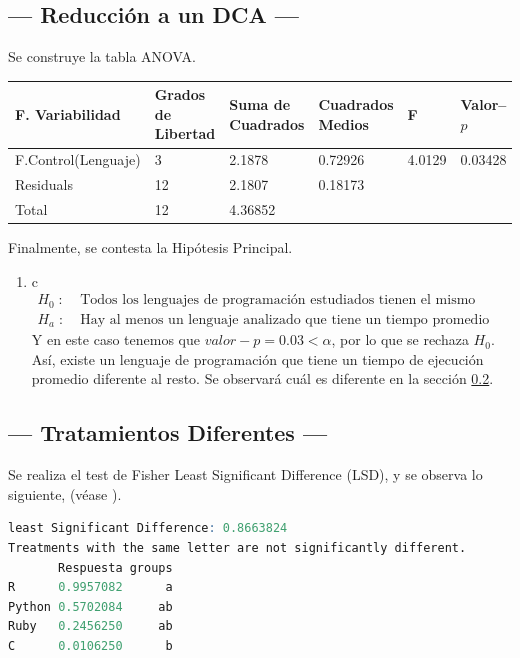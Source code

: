 \documentclass[11pt,a4paper]{article}
\begin{document}
\subsection{--- Reducción a un DCA ---} %
\label{sub:dca}
Se construye la tabla ANOVA.
\begin{table}[hbt!]
	\centering
	\footnotesize
	\begin{tabular}{|*{6}{l|}}
		\hline
		F. Variabilidad     & Grados de Libertad & Suma de Cuadrados & Cuadrados Medios & F & Valor--\(p\) \\ \hline
		F.Control(Lenguaje) &  3 & 2.1878 & 0.72926  & 4.0129 & 0.03428\\ \hline
		Residuals           & 12 & 2.1807 & 0.18173  &        &        \\ \hline
		Total               &12 & 4.36852 &          &        & \\ \hline
	\end{tabular}
	\label{tab:nuevo_modelo}
\end{table}
Finalmente, se contesta la Hipótesis Principal.
\begin{enumerate}
	\item[\fbox{Hip. Principal}] \color{white} c \color{black} \vspace{-5mm}
		\[
			\begin{array}{rl}
				H_0 \;:\; & \mbox{Todos los lenguajes de programación estudiados tienen el mismo tiempo de ejecución promedio.} \\
				H_a \;:\; & \mbox{Hay al menos un lenguaje analizado que tiene un tiempo promedio de ejecución diferente.}
			\end{array}
		\]
		Y en este caso tenemos que \(valor-p = 0.03 < \alpha\), por lo que se rechaza \(H_0\).
		Así, existe un lenguaje de programación que tiene un tiempo de ejecución promedio diferente al resto.
		Se observará cuál es diferente en la sección \ref{sub:trata_diferentes}.
\end{enumerate}

\subsection{--- Tratamientos Diferentes ---} %
\label{sub:trata_diferentes}
Se realiza el test de Fisher Least Significant Difference (LSD), y se observa lo siguiente, (véase ).
\begin{lstlisting}[language = R]
least Significant Difference: 0.8663824 
Treatments with the same letter are not significantly different.
       Respuesta groups
R      0.9957082      a
Python 0.5702084     ab
Ruby   0.2456250     ab
C      0.0106250      b
\end{lstlisting}
\end{document}
